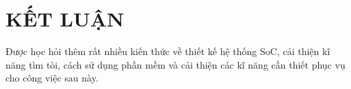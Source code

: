 \chapter{KẾT LUẬN}
\label{Chapter6}

Được học hỏi thêm rất nhiều kiến thức về thiết kế hệ thống SoC, cải thiện kĩ năng tìm tòi, cách sử dụng phần mềm và cải thiện các kĩ năng cần thiết phục vụ cho công việc sau này.